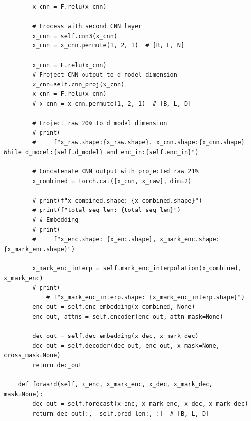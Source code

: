 \documentclass[stu,12pt,floatsintext]{apa7}
\begin{document}
\begin{verbatim}
        x_cnn = F.relu(x_cnn)

        # Process with second CNN layer
        x_cnn = self.cnn3(x_cnn)
        x_cnn = x_cnn.permute(1, 2, 1)  # [B, L, N]

        x_cnn = F.relu(x_cnn)
        # Project CNN output to d_model dimension
        x_cnn=self.cnn_proj(x_cnn)
        x_cnn = F.relu(x_cnn)
        # x_cnn = x_cnn.permute(1, 2, 1)  # [B, L, D]

        # Project raw 20% to d_model dimension
        # print(
        #     f"x_raw.shape:{x_raw.shape}. x_cnn.shape:{x_cnn.shape} While d_model:{self.d_model} and enc_in:{self.enc_in}")

        # Concatenate CNN output with projected raw 21%
        x_combined = torch.cat([x_cnn, x_raw], dim=2)

        # print(f"x_combined.shape: {x_combined.shape}")
        # print(f"total_seq_len: {total_seq_len}")
        # # Embedding
        # print(
        #     f"x_enc.shape: {x_enc.shape}, x_mark_enc.shape: {x_mark_enc.shape}")

        x_mark_enc_interp = self.mark_enc_interpolation(x_combined, x_mark_enc)
        # print(
            # f"x_mark_enc_interp.shape: {x_mark_enc_interp.shape}")
        enc_out = self.enc_embedding(x_combined, None)
        enc_out, attns = self.encoder(enc_out, attn_mask=None)

        dec_out = self.dec_embedding(x_dec, x_mark_dec)
        dec_out = self.decoder(dec_out, enc_out, x_mask=None, cross_mask=None)
        return dec_out

    def forward(self, x_enc, x_mark_enc, x_dec, x_mark_dec, mask=None):
        dec_out = self.forecast(x_enc, x_mark_enc, x_dec, x_mark_dec)
        return dec_out[:, -self.pred_len:, :]  # [B, L, D]

\end{verbatim}
\end{document}

